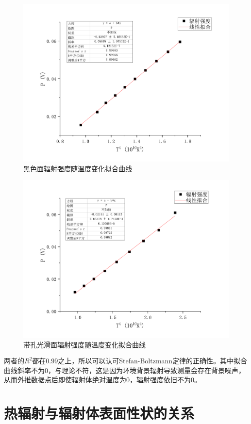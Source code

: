\documentclass{WHUReport}
\begin{document}
\begin{multicols}{2}
	\begin{figure}[H]
		\centering
		\includegraphics[width=\linewidth]{figs/black4.pdf}
		\caption{黑色面辐射强度随温度变化拟合曲线}
	\end{figure}
	\begin{figure}[H]
		\centering
		\includegraphics[width=\linewidth]{figs/hole4.pdf}
		\caption{带孔光滑面辐射强度随温度变化拟合曲线}
	\end{figure}
	两者的$R^2$都在$0.99$之上，所以可以认可Stefan-Boltzmann定律的正确性。其中拟合曲线斜率不为$0$，与理论不符，这是因为环境背景辐射导致测量会存在背景噪声，从而外推数据点后即使辐射体绝对温度为$0$，辐射强度依旧不为$0$。
	\section{热辐射与辐射体表面性状的关系}

\end{multicols}
\end{document}
